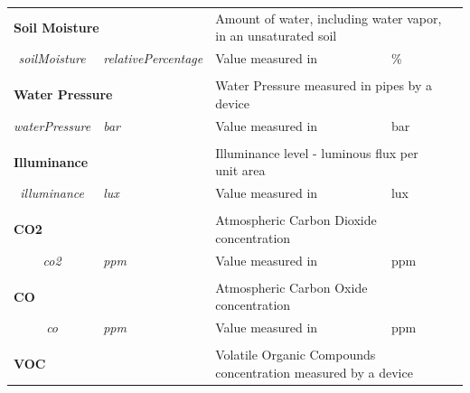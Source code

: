 \begin{landscape}
\begin{longtable}{cllll}
   \\[-0.85em]
   \multicolumn{2}{l}{\textbf{Soil Moisture}}                                 & \multicolumn{2}{l}{Amount of water, including water vapor, in an unsaturated soil}      &  \\
   \textit{soilMoisture}                  & \textit{relativePercentage}        & Value measured in                                      & \%                             &  \\ [0.4em] \cline{1-4}
   \\[-0.85em]
   \multicolumn{2}{l}{\textbf{Water Pressure}}                                & \multicolumn{2}{l}{Water Pressure measured in pipes by a device}                        &  \\
   \textit{waterPressure}                & \textit{bar}                       & Value measured in                                      & bar                            &  \\ [0.4em] \cline{1-4}
   \\[-0.85em]
   \multicolumn{2}{l}{\textbf{Illuminance}}                                   & \multicolumn{2}{l}{Illuminance level - luminous flux per unit area}                     &  \\
   \textit{illuminance}                  & \textit{lux}                       & Value measured in                                      & lux                            &  \\ [0.4em] \cline{1-4}
   \\[-0.85em]
   \multicolumn{2}{l}{\textbf{CO2}}                                           & \multicolumn{2}{l}{Atmospheric Carbon Dioxide concentration}                            &  \\
   \textit{co2}                          & \textit{ppm}                       & Value measured in                                      & ppm                            &  \\ [0.4em] \cline{1-4}
   \\[-0.85em]
   \multicolumn{2}{l}{\textbf{CO}}                                            & \multicolumn{2}{l}{Atmospheric Carbon Oxide concentration}                              &  \\
   \textit{co}                           & \textit{ppm}                       & Value measured in                                      & ppm                            &  \\ [0.4em] \cline{1-4}
   \\[-0.85em]
   \multicolumn{2}{l}{\textbf{VOC}}                                           & \multicolumn{2}{l}{Volatile Organic Compounds concentration measured by a device}       &  \\

\end{longtable}
\end{landscape}
